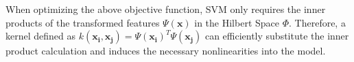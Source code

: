 
When optimizing the above objective function, SVM only requires the inner products of the transformed features $\Psi(\mathbf{x})$ in the Hilbert Space $\Phi$. Therefore, a kernel defined as $k(\mathbf{x_i},\mathbf{x_j}) = \Psi(\mathbf{x_i})^T\Psi(\mathbf{x_j})$ can efficiently substitute the inner product calculation and induces the necessary nonlinearities into the model\cite{evgeniou2000regularization}.









